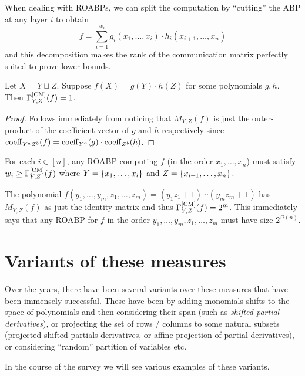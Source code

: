 When dealing with ROABPs, we can split the computation by ``cutting'' the ABP at any layer $i$ to obtain
\[
f = \sum_{i=1}^{w_i} g_i(x_1,\ldots, x_i) \cdot h_i(x_{i+1}, \ldots, x_n)
\]
and this decomposition makes the rank of the communication matrix perfectly suited to prove lower bounds. 

\begin{observation}
Let $X = Y \sqcup Z$. Suppose $f(X) = g(Y) \cdot h(Z)$ for some polynomials $g,h$. Then $\Gamma^{\mathrm{[CM]}}_{Y,Z}(f) = 1$. 
\end{observation}
\begin{proof}
Follows immediately from noticing that $M_{Y,Z}(f)$ is just the outer-product of the coefficient vector of $g$ and $h$ respectively since $\operatorname{coeff}_{Y^aZ^b}(f) = \operatorname{coeff}_{Y^a}(g) \cdot \operatorname{coeff}_{Z^b}(h)$. 
\end{proof}

\begin{corollary}
For each $i \in [n]$, any ROABP computing $f$ (in the order $x_1,\ldots, x_n$) must satisfy $w_i \geq \Gamma^{\mathrm{[CM]}}_{Y,Z}(f)$ where $Y = \left\{x_1,\ldots, x_i\right\}$ and $Z = \left\{x_{i+1}, \ldots, x_n\right\}$. 
\end{corollary}

The polynomial $f(y_1,\ldots, y_m, z_1,\ldots, z_m) = (y_1 z_1 + 1) \cdots (y_m z_m + 1)$ has $M_{Y,Z}(f)$ as just the identity matrix and thus $\Gamma^{\mathrm{[CM]}}_{Y,Z}(f) = 2^m$. This immediately says that any ROABP for $f$ in the order $y_1,\ldots, y_m, z_1,\ldots, z_m$ must have size $2^{\Omega(n)}$. 

\section{Variants of these measures}

Over the years, there have been several variants over these measures that have been immensely successful. These have been by adding monomials shifts to the space of polynomials and then considering their span (such as \emph{shifted partial derivatives}), or projecting the set of rows / columns to some natural subsets (projected shifted partials derivatives, or affine projection of partial derivatives), or considering ``random'' partition of variables etc.

In the course of the survey we will see various examples of these variants. 
